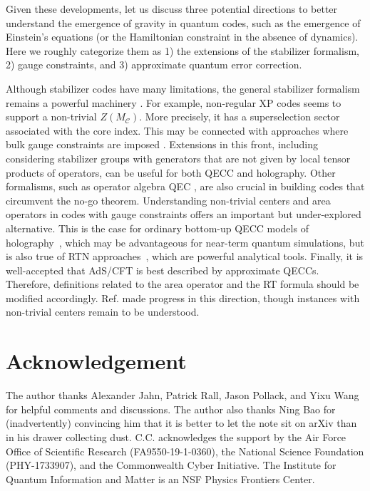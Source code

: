 \documentclass[a4paper,11pt]{article}
\theoremstyle{definition}
\numberwithin{equation}{section}
\begin{document}
Given these developments, let us discuss three potential directions to better understand the emergence of gravity in quantum codes, such as the emergence of Einstein's equations (or the Hamiltonian constraint in the absence of dynamics). 
Here we roughly categorize them as 1) the extensions of the stabilizer formalism, 2) gauge constraints, and 3) approximate quantum error correction. 

Although stabilizer codes have many limitations, the general stabilizer formalism remains a powerful machinery \cite{XS,XP,CWS}.  For example, non-regular XP codes seems to support a non-trivial $Z(M_{\mathcal{C}})$. More precisely, it has a superselection sector associated with the core index. This may be connected with approaches where bulk gauge constraints are imposed \cite{Dolev:2021ofc}. Extensions in this front, including considering stabilizer groups with generators that are not given by local tensor products of operators, can be useful for both QECC and holography. Other formalisms, such as operator algebra QEC \cite{OAQEC1,OAQEC2,STABOAQEC}, are also crucial in building codes that circumvent the no-go theorem. Understanding non-trivial centers and area operators in codes with gauge constraints offers an important but under-explored alternative. This is the case for ordinary bottom-up QECC models of holography~\cite{Dolev:2021ofc}, which may be advantageous for near-term quantum simulations, but is also true of RTN approaches~\cite{Qi:2022lbd,Dong:2023kyr}, which are powerful analytical tools. 
Finally, it is well-accepted that AdS/CFT is best described by approximate QECCs. Therefore, definitions related to the area operator and the RT formula should be modified accordingly.  Ref.\cite{AP2021} made progress in this direction, though instances with non-trivial centers remain to be understood.

\section*{Acknowledgement}
The author thanks Alexander Jahn, Patrick Rall, Jason Pollack, and Yixu Wang for helpful comments and discussions. The author also thanks Ning Bao for (inadvertently) convincing him that it is better to let the note sit on arXiv than in his drawer collecting dust. C.C. acknowledges the support by the Air Force Office of Scientific Research (FA9550-19-1-0360), the National Science Foundation (PHY-1733907), and the Commonwealth Cyber Initiative. The Institute for Quantum Information and Matter is an NSF Physics Frontiers Center.
\end{document}
